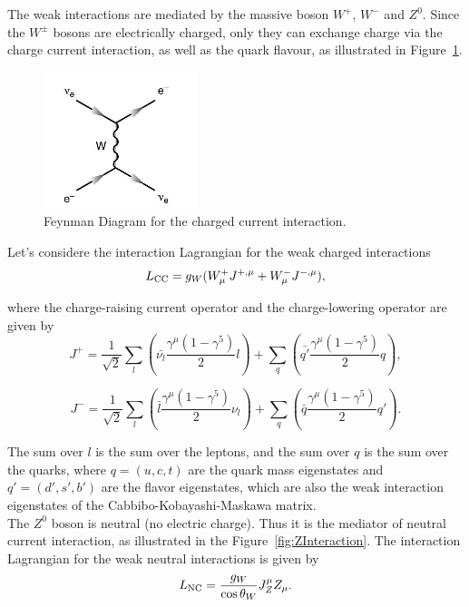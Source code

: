 \documentclass[10pt,swedish, openany]{book}
\begin{document}
The weak interactions are mediated by the massive boson $W^+$, $W^-$ and $Z^0$. Since the $W^{\pm}$ bosons are electrically charged, only they can exchange charge via the charge current interaction, as well as the quark flavour, as illustrated in Figure~\ref{fig:WInteraction}.
  
\begin{figure}[h]
\includegraphics[scale=0.8]{charged.png}
\centering
\caption{Feynman Diagram for the charged current interaction.}
\label{fig:WInteraction}
\end{figure}  
  
Let's considere the interaction Lagrangian for the weak charged interactions
\begin{equation}
    L_{\rm CC} = g_W(W^+_{\mu}J^{+ ,\mu} + W^-_{\mu}J^{- ,\mu}),
\end{equation}

where the charge-raising current operator and the charge-lowering operator are given by
\begin{equation}
    J^+ = \frac{1}{\sqrt{2}} \sum_l (\bar{\nu_l}\frac{\gamma^{\mu}(1-\gamma^5)}{2}l) + \sum_q (\bar{q'}\frac{\gamma^{\mu}(1-\gamma^5)}{2}q),
\end{equation}

\begin{equation}
    J^- = \frac{1}{\sqrt{2}} \sum_l (\bar{l}\frac{\gamma^{\mu}(1-\gamma^5)}{2}\nu_l) + \sum_q (\bar{q}\frac{\gamma^{\mu}(1-\gamma^5)}{2}q').
\end{equation}

The sum over $l$ is the sum over the leptons, and the sum over $q$ is the sum over the quarks, where $q=(u,c,t)$ are the quark mass eigenstates and $q'=(d',s',b')$ are the flavor eigenstates, which are also the weak interaction eigenstates of the Cabbibo-Kobayashi-Maskawa matrix.\\

The $Z^0$ boson is neutral (no electric charge). Thus it is the mediator of neutral current interaction, as illustrated in the Figure~\ref{fig:ZInteraction}. The interaction Lagrangian for the weak neutral interactions is given by
\begin{equation}
    L_{\rm NC} = \frac{g_W}{\cos{\theta_W}}J^{\mu}_Z Z_{\mu}.
\end{equation}
\end{document}
